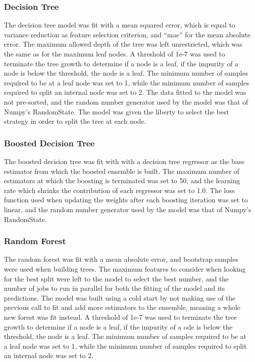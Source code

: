 \subsubsection{Decision Tree}
The decision tree model was fit with a mean squared error, which is equal to variance reduction as feature selection criterion, and “mae” for the mean absolute error. The maximum allowed depth of the tree was left unrestricted, which was the same as for the maximum leaf nodes. A threshold of 1e-7 was used to terminate the tree growth to determine if a node is a leaf, if the impurity of a node is below the threshold, the node is a leaf. The minimum number of samples required to be at a leaf node was set to 1, while the minimum number of samples required to split an internal node was set to 2. The data fitted to the model was not pre-sorted, and the random number generator used by the model was that of Numpy's RandomState. The model was given the liberty to select the best strategy in order to split the tree at each node.

\subsubsection{Boosted Decision Tree}
The boosted decision tree was fit with with a decision tree regressor as the base estimator from which the boosted ensemble is built. The maximum number of estimators at which the boosting is terminated was set to 50, and the learning rate which shrinks the contribution of each regressor was set to 1.0. The loss function used when updating the weights after each boosting iteration was set to linear, and the random number generator used by the model was that of Numpy's RandomState.

\subsubsection{Random Forest}
The random forest was fit with a mean absolute error, and bootstrap samples were used when building trees. The maximum features to consider when looking for the best split were left to the model to select the best number, and the number of jobs to run in parallel for both the fitting of the model and its predictions. The model was built using a cold start by not making use of the previous call to fit and add more estimators to the ensemble, meaning a whole new forest was fit instead. A threshold of 1e-7 was used to terminate the tree growth to determine if a node is a leaf, if the impurity of a ode is below the threshold, the node is a leaf. The minimum number of samples required to be at a leaf node was set to 1, while the minimum number of samples required to split an internal node was set to 2.

